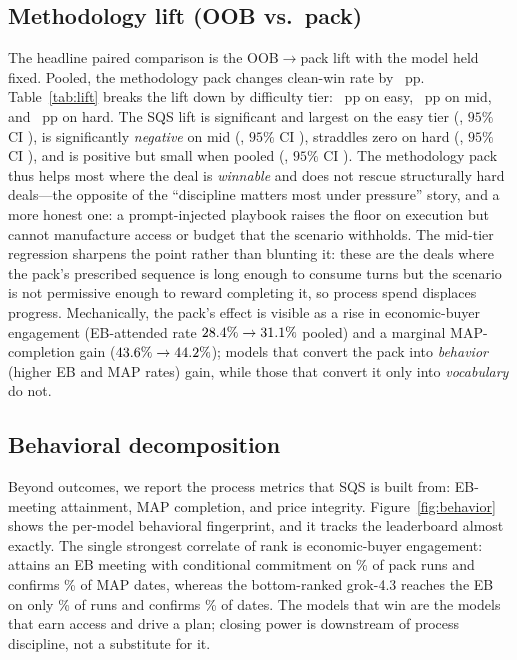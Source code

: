 \subsection{Methodology lift (OOB vs.\ pack)}
The headline paired comparison is the OOB$\to$pack lift with the model held fixed.
Pooled, the methodology pack changes clean-win rate by \resPackLiftOverall{}~pp.
Table~\ref{tab:lift} breaks the lift down by difficulty tier: \resLiftEasy{}~pp on
easy, \resLiftMid{}~pp on mid, and \resLiftHard{}~pp on hard. The SQS lift is
significant and largest on the easy tier (\resSQSLiftEasy{}, $95\%$ CI
\resSQSCIEasy{}), is significantly \emph{negative} on mid (\resSQSLiftMid{}, $95\%$
CI \resSQSCIMid{}), straddles zero on hard (\resSQSLiftHard{}, $95\%$ CI
\resSQSCIHard{}), and is positive but small when
pooled (\resSQSLiftPooled{}, $95\%$ CI \resSQSCIPooled{}). The methodology pack thus helps most
where the deal is \emph{winnable} and does not rescue structurally hard deals---the
opposite of the ``discipline matters most under pressure'' story, and a more honest
one: a prompt-injected playbook raises the floor on execution but cannot manufacture
access or budget that the scenario withholds. The mid-tier regression sharpens the
point rather than blunting it: these are the deals where the pack's prescribed
sequence is long enough to consume turns but the scenario is not permissive enough
to reward completing it, so process spend displaces progress. Mechanically, the pack's effect is
visible as a rise in economic-buyer engagement (EB-attended rate
$28.4\%\to31.1\%$
pooled) and a marginal MAP-completion gain ($43.6\%\to44.2\%$); models that convert
the pack into \emph{behavior} (higher EB and MAP rates) gain, while those that
convert it only into \emph{vocabulary} do not.



\subsection{Behavioral decomposition}
Beyond outcomes, we report the process metrics that SQS is built from: EB-meeting
attainment, MAP completion, and price integrity. Figure~\ref{fig:behavior} shows the
per-model behavioral fingerprint, and it tracks the leaderboard almost exactly. The
single strongest correlate of rank is economic-buyer engagement: \resBestModel{}
attains an EB meeting with conditional commitment on \resBestModelEB{}\% of pack runs and
confirms \resBestModelMAP{}\% of MAP dates, whereas the bottom-ranked grok-4.3 reaches the EB on
only \resWorstModelEB{}\% of runs and confirms \resWorstModelMAP{}\% of dates. The models that win are the
models that earn access and drive a plan; closing power is downstream of process
discipline, not a substitute for it.

